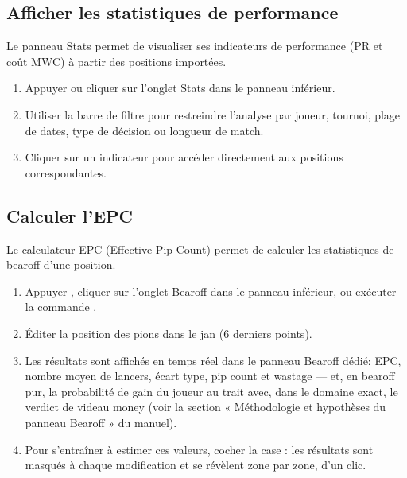 \documentclass[letterpaper,10pt,french]{sphinxmanual}
\begin{document}
\subsection{Afficher les statistiques de performance}
\label{\detokenize{guide_utilisateur:afficher-les-statistiques-de-performance}}
\sphinxAtStartPar
Le panneau Stats permet de visualiser ses indicateurs de performance (PR et coût MWC)
à partir des positions importées.
\begin{enumerate}
%
\item {} 
\sphinxAtStartPar
Appuyer  ou cliquer sur l’onglet Stats dans le panneau inférieur.

\item {} 
\sphinxAtStartPar
Utiliser la barre de filtre pour restreindre l’analyse par joueur,
tournoi, plage de dates, type de décision ou longueur de match.

\item {} 
\sphinxAtStartPar
Cliquer sur un indicateur pour accéder directement aux positions correspondantes.

\end{enumerate}


\subsection{Calculer l’EPC}
\label{\detokenize{guide_utilisateur:calculer-l-epc}}
\sphinxAtStartPar
Le calculateur EPC (Effective Pip Count) permet de calculer les statistiques de
bearoff d’une position.
\begin{enumerate}
%
\item {} 
\sphinxAtStartPar
Appuyer , cliquer sur l’onglet Bearoff dans le panneau inférieur,
ou exécuter la commande .

\item {} 
\sphinxAtStartPar
Éditer la position des pions dans le jan (6 derniers points).

\item {} 
\sphinxAtStartPar
Les résultats sont affichés en temps réel dans le panneau Bearoff dédié:
EPC, nombre moyen de lancers, écart type, pip count et wastage — et, en
bearoff pur, la probabilité de gain du joueur au trait avec, dans le
domaine exact, le verdict de videau money (voir la section
« Méthodologie et hypothèses du panneau Bearoff » du manuel).

\item {} 
\sphinxAtStartPar
Pour s’entraîner à estimer ces valeurs, cocher la case  : les
résultats sont masqués à chaque modification et se révèlent zone par
zone, d’un clic.

\end{enumerate}
\end{document}
